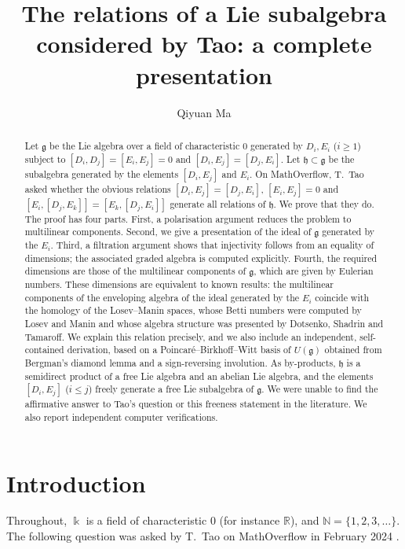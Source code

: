\documentclass[11pt]{amsart}
\title[Relations in a Lie algebra of Tao]{The relations of a Lie subalgebra considered by Tao: a complete presentation}
\author{Qiyuan Ma}
\date{}
\theoremstyle{definition}
\theoremstyle{remark}
\newcommand{\N}{\mathbb{N}}
\newcommand{\R}{\mathbb{R}}
\newcommand{\kk}{\Bbbk}
\newcommand{\g}{\mathfrak{g}}
\newcommand{\h}{\mathfrak{h}}
\begin{document}
\begin{abstract}
Let $\g$ be the Lie algebra over a field of characteristic $0$ generated by $D_i,E_i$ ($i\ge 1$) subject to $[D_i,D_j]=[E_i,E_j]=0$ and $[D_i,E_j]=[D_j,E_i]$. Let $\h\subset\g$ be the subalgebra generated by the elements $[D_i,E_j]$ and $E_i$. On MathOverflow, T.~Tao asked whether the obvious relations $[D_i,E_j]=[D_j,E_i]$, $[E_i,E_j]=0$ and $[E_i,[D_j,E_k]]=[E_k,[D_j,E_i]]$ generate all relations of $\h$. We prove that they do. The proof has four parts. First, a polarisation argument reduces the problem to multilinear components. Second, we give a presentation of the ideal of $\g$ generated by the $E_i$. Third, a filtration argument shows that injectivity follows from an equality of dimensions; the associated graded algebra is computed explicitly. Fourth, the required dimensions are those of the multilinear components of $\g$, which are given by Eulerian numbers. These dimensions are equivalent to known results: the multilinear components of the enveloping algebra of the ideal generated by the $E_i$ coincide with the homology of the Losev--Manin spaces, whose Betti numbers were computed by Losev and Manin and whose algebra structure was presented by Dotsenko, Shadrin and Tamaroff. We explain this relation precisely, and we also include an independent, self-contained derivation, based on a Poincar\'e--Birkhoff--Witt basis of $U(\g)$ obtained from Bergman's diamond lemma and a sign-reversing involution. As by-products, $\h$ is a semidirect product of a free Lie algebra and an abelian Lie algebra, and the elements $[D_i,E_j]$ ($i\le j$) freely generate a free Lie subalgebra of $\g$. We were unable to find the affirmative answer to Tao's question or this freeness statement in the literature. We also report independent computer verifications.
\end{abstract}

\maketitle

\section{Introduction}

Throughout, $\kk$ is a field of characteristic $0$ (for instance $\R$), and $\N=\{1,2,3,\dots\}$. The following question was asked by T.~Tao on MathOverflow in February 2024 \cite{MO}.
\end{document}
